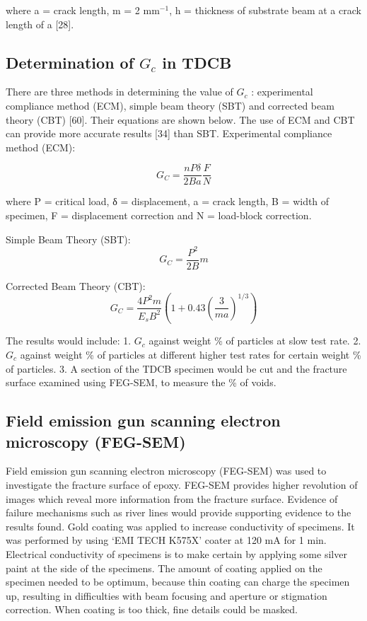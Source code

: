 \documentclass[numbers=noendperiod,chapterprefix=on]{icldt} %
\begin{document}
where a = crack length, m = 2 mm$^{-1}$, h = thickness of substrate beam at a crack length of a [28].

\subsection{Determination of $G_c$ in TDCB}
There are three methods in determining the value of $G_c$ : experimental compliance method (ECM), simple beam theory (SBT) and corrected beam theory (CBT) [60]. Their equations are shown below. The use of ECM and CBT can provide more accurate results [34] than SBT.\newline
Experimental compliance method (ECM):

\begin{equation} 
G_C=\frac{nPδ}{2Ba}\frac{F}{N} 
\end{equation}

where P = critical load, δ = displacement, a = crack length, B = width of specimen, F = displacement correction and N = load-block correction.

Simple Beam Theory (SBT):
\begin{equation} 
G_C=\frac{P^2}{2B}m
\end{equation}

Corrected Beam Theory (CBT):
\begin{equation} 
G_C=\frac{4P^2 m}{E_s B^2}\left( 1+0.43\left( \frac{3}{ma}\right) ^{1/3} \right) 
\end{equation}

The results would include:
1.	$G_c$ against weight \% of particles at slow test rate. 
2.	$G_c$ against weight \% of particles at different higher test rates for certain weight \% of particles. 
3.	A section of the TDCB specimen would be cut and the fracture surface examined using FEG-SEM, to measure the \% of voids. 

\subsection{Field emission gun scanning electron microscopy (FEG-SEM)}
Field emission gun scanning electron microscopy (FEG-SEM) was used to investigate the fracture surface of epoxy. FEG-SEM provides higher revolution of images which reveal more information from the fracture surface. Evidence of failure mechanisms such as river lines would provide supporting evidence to the results found. 
Gold coating was applied to increase conductivity of specimens. It was performed by using ‘EMI TECH K575X’ coater at 120 mA for 1 min. Electrical conductivity of specimens is to make certain by applying some silver paint at the side of the specimens.
The amount of coating applied on the specimen needed to be optimum, because thin coating can charge the specimen up, resulting in difficulties with beam focusing and aperture or stigmation correction. When coating is too thick, fine details could be masked.
\end{document}
